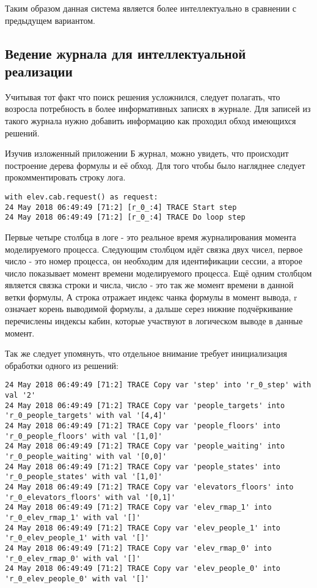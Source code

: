 	Таким образом данная система является более интеллектуально в сравнении с предыдущем вариантом.

	\subsection{Ведение журнала для интеллектуальной реализации}
		Учитывая тот факт что поиск решения усложнился, следует полагать, что возросла потребность
			в более информативных записях в журнале. Для записей из такого журнала
			нужно добавить информацию как проходил обход имеющихся решений.

		Изучив изложенный приложении Б журнал, можно увидеть, что происходит построение дерева формулы и её обход.
			Для того чтобы было нагляднее следует прокомментировать строку лога.

\begin{lstlisting}
with elev.cab.request() as request:
24 May 2018 06:49:49 [71:2] [r_0_:4] TRACE Start step
24 May 2018 06:49:49 [71:2] [r_0_:4] TRACE Do loop step
\end{lstlisting}

		Первые четыре столбца в логе - это реальное время журналирования момента моделируемого процесса.
			Следующим столбцом идёт связка двух чисел, первое число - это номер процесса,
			он необходим для идентификации сессии, а второе число показывает момент времени моделируемого процесса.
			Ещё одним столбцом является связка строки и числа, число - это так же момент времени в данной ветки формулы,
			А строка отражает индекс чанка формулы в момент вывода, r означает корень выводимой формулы,
			а дальше серез нижние подчёркивание перечислены индексы кабин, которые участвуют
			в логическом выводе в данные момент.

		Так же следует упомянуть, что отдельное внимание требует инициализация обработки одного из решений:

\begin{lstlisting}
24 May 2018 06:49:49 [71:2] TRACE Copy var 'step' into 'r_0_step' with val '2'
24 May 2018 06:49:49 [71:2] TRACE Copy var 'people_targets' into 'r_0_people_targets' with val '[4,4]'
24 May 2018 06:49:49 [71:2] TRACE Copy var 'people_floors' into 'r_0_people_floors' with val '[1,0]'
24 May 2018 06:49:49 [71:2] TRACE Copy var 'people_waiting' into 'r_0_people_waiting' with val '[0,0]'
24 May 2018 06:49:49 [71:2] TRACE Copy var 'people_states' into 'r_0_people_states' with val '[1,0]'
24 May 2018 06:49:49 [71:2] TRACE Copy var 'elevators_floors' into 'r_0_elevators_floors' with val '[0,1]'
24 May 2018 06:49:49 [71:2] TRACE Copy var 'elev_rmap_1' into 'r_0_elev_rmap_1' with val '[]'
24 May 2018 06:49:49 [71:2] TRACE Copy var 'elev_people_1' into 'r_0_elev_people_1' with val '[]'
24 May 2018 06:49:49 [71:2] TRACE Copy var 'elev_rmap_0' into 'r_0_elev_rmap_0' with val '[]'
24 May 2018 06:49:49 [71:2] TRACE Copy var 'elev_people_0' into 'r_0_elev_people_0' with val '[]'
\end{lstlisting}


